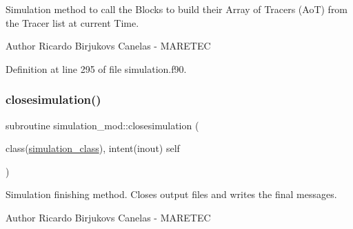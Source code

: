 Simulation method to call the Blocks to build their Array of Tracers (AoT) from the Tracer list at current Time. 

\begin{DoxyAuthor}{Author}
Ricardo Birjukovs Canelas -\/ M\+A\+R\+E\+T\+EC 
\end{DoxyAuthor}


Definition at line 295 of file simulation.\+f90.


\mbox{\label{namespacesimulation__mod_a4285722eaa589fa671233554b54c74f8}} 
\subsubsection{\texorpdfstring{closesimulation()}{closesimulation()}}
{\footnotesize\ttfamily subroutine simulation\+\_\+mod\+::closesimulation (\begin{DoxyParamCaption}\item[{class(\mbox{\hyperlink{structsimulation__mod_1_1simulation__class}{simulation\+\_\+class}}), intent(inout)}]{self }\end{DoxyParamCaption})\hspace{0.3cm}{\ttfamily [private]}}



Simulation finishing method. Closes output files and writes the final messages. 

\begin{DoxyAuthor}{Author}
Ricardo Birjukovs Canelas -\/ M\+A\+R\+E\+T\+EC 
\end{DoxyAuthor}


